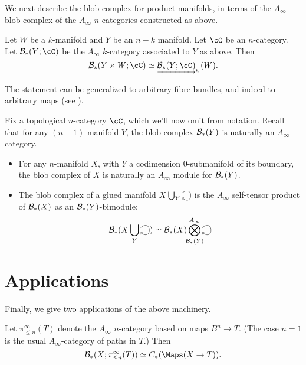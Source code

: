 \documentclass{pnastwo}
\begin{document}
\begin{article}
We next describe the blob complex for product manifolds, in terms of the $A_\infty$ blob complex of the $A_\infty$ $n$-categories constructed as above.

\begin{thm}
\label{thm:product}
Let $W$ be a $k$-manifold and $Y$ be an $n-k$ manifold.
Let $\cC$ be an $n$-category.
Let $\bc_*(Y;\cC)$ be the $A_\infty$ $k$-category associated to $Y$ as above.
Then
\[
	\bc_*(Y\times W; \cC) \simeq \clh{\bc_*(Y;\cC)}(W).
\]
\end{thm}
The statement can be generalized to arbitrary fibre bundles, and indeed to arbitrary maps
(see \cite[\S7.1]{1009.5025}).

Fix a topological $n$-category $\cC$, which we'll now omit from notation.
Recall that for any $(n-1)$-manifold $Y$, the blob complex ${\mathcal B}_*(Y)$ is naturally an $A_\infty$ category.

\begin{thm}
\label{thm:gluing}
\mbox{}%
\begin{itemize}
\item For any $n$-manifold $X$, with $Y$ a codimension $0$-submanifold of its boundary, the blob complex of $X$ is naturally an
$A_\infty$ module for ${\mathcal B}_*(Y)$.

\item The blob complex of a glued manifold $X\bigcup_Y \selfarrow$ is the $A_\infty$ self-tensor product of
${\mathcal B}_*(X)$ as an ${\mathcal B}_*(Y)$-bimodule:
\begin{equation*}
\bc_*(X\bigcup_Y \selfarrow) \simeq \bc_*(X) \Tensor^{A_\infty}_{\mathclap{\bc_*(Y)}} \selfarrow
\end{equation*}
\end{itemize}
\end{thm}


\section{Applications}
\label{sec:applications}
Finally, we give two applications of the above machinery.

\begin{thm}
\label{thm:map-recon}
Let $\pi^\infty_{\le n}(T)$ denote the $A_\infty$ $n$-category based on maps 
$B^n \to T$.
(The case $n=1$ is the usual $A_\infty$-category of paths in $T$.)
Then 
$$\bc_*(X; \pi^\infty_{\le n}(T)) \simeq \CM{X}{T}.$$
\end{thm}


\end{article}
\end{document}
